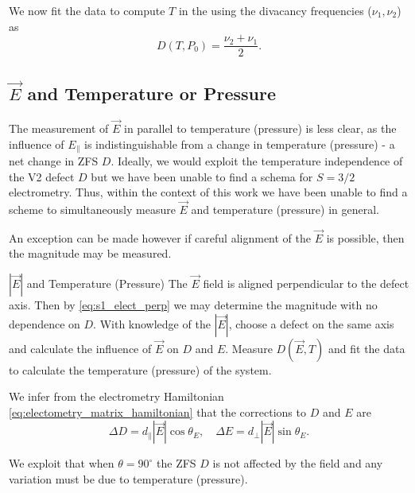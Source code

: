 We now fit the data to compute $T$ in the using the divacancy frequencies ($\nu_1, \nu_2$) as 
\begin{equation}
    D(T, P_0) = \frac{\nu_2 + \nu_1}{2}.
    \label{eq:}
\end{equation}

\subsection{$\vec{E}$ and Temperature or Pressure}\label{multi-E-pressure}
The measurement of $\vec{E}$ in parallel to temperature (pressure) is less clear, as the influence of $E_\parallel$ is indistinguishable from a change in temperature (pressure) - a net change in ZFS $D$. Ideally, we would exploit the temperature independence of the V2 defect $D$ but we have been unable to find a schema for $S=3/2$ electrometry. 
Thus, within the context of this work we have been unable to find a scheme to simultaneously measure $\vec{E}$ and temperature (pressure) in general.  

An exception can be made however if careful alignment of the $\vec{E}$ is possible, then the magnitude may be measured. 

\begin{proposal}{$|\vec{E}|$ and Temperature (Pressure)}
    The $\vec{E}$ field is aligned perpendicular to the defect axis. Then by \eqref{eq:s1_elect_perp} we may determine the magnitude with no dependence on $D$. With knowledge of the $|\vec{E}|$, choose a defect on the same axis and calculate the influence of $\vec{E}$ on $D$ and $E$. Measure $D(\vec{E}, T)$ and fit the data to calculate the temperature (pressure) of the system. 
\end{proposal}

We infer from the electrometry Hamiltonian \eqref{eq:electometry_matrix_hamiltonian} that the corrections to $D$ and $E$ are 
\begin{equation}
    \Delta D = d_\parallel |\vec{E}| \cos\theta_E, \quad \Delta E = d_\perp |\vec{E}| \sin \theta_E.
    \label{eq:}
\end{equation}

We exploit that when $\theta = 90^\circ$ the ZFS $D$ is not affected by the field and any variation must be due to temperature (pressure). 

